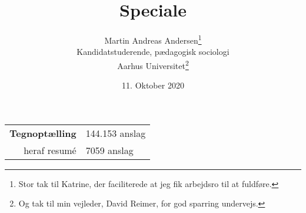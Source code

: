 \documentclass[a4paper,oneside,openbib,openany,final]{memoir}
\author{
  Martin Andreas Andersen\thanks{Stor tak til Katrine, der faciliterede at jeg fik arbejdsro til at fuldføre.} \\
  Kandidatstuderende, pædagogisk sociologi \\
Aarhus Universitet\thanks{Og tak til min vejleder, David Reimer, for god sparring undervejs.}}
\title{
  Speciale \\
\sffamily{Et kvantitativt perspektiv på en kvalitativ undersøgelse}}
\date{11. Oktober 2020}
\begin{document}
\captiontitlefont{\normalfont\normalsize}
\captionnamefont{\normalsize}
\setlength{}



\begin{titlingpage}
\maketitle
\end{titlingpage}
\frontmatter
\tableofcontents
\listoftables
\listoffigures
\begin{table*}[bp]
\centering \begin{tabular}{rl}
    \textbf{Tegnoptælling} & 144.153 anslag \\
    heraf resumé & 7059 anslag \\
  \end{tabular}
\end{table*}
\newpage
\mainmatter






\backmatter
\printbibliography
\end{document}
